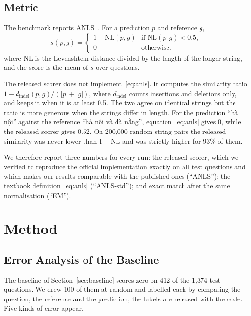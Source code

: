 \documentclass[conference]{IEEEtran}
\newcommand{\vi}[1]{{\fontencoding{T5}\selectfont #1}}
\newcommand{\vi}[1]{#1}
\begin{document}
\subsection{Metric}
\label{sec:metric}
The benchmark reports ANLS~\cite{stvqa}. For a prediction $p$ and reference $g$,
\begin{equation}
s(p, g) =
\begin{cases}
1 - \mathrm{NL}(p, g) & \text{if } \mathrm{NL}(p, g) < 0.5,\\
0 & \text{otherwise,}
\end{cases}
\label{eq:anls}
\end{equation}
where $\mathrm{NL}$ is the Levenshtein distance divided by the length of the longer string, and the score is the mean of $s$ over questions.

The released scorer does not implement~\eqref{eq:anls}. It computes the similarity ratio $1 - d_{\mathrm{indel}}(p, g) / (|p| + |g|)$, where $d_{\mathrm{indel}}$ counts insertions and deletions only, and keeps it when it is at least 0.5. The two agree on identical strings but the ratio is more generous when the strings differ in length. For the prediction ``\vi{hà nội}'' against the reference ``\vi{hà nội và đà nẵng}'', equation~\eqref{eq:anls} gives 0, while the released scorer gives 0.52. On 200{,}000 random string pairs the released similarity was never lower than $1 - \mathrm{NL}$ and was strictly higher for 93\% of them.

We therefore report three numbers for every run: the released scorer, which we verified to reproduce the official implementation exactly on all test questions and which makes our results comparable with the published ones (``ANLS''); the textbook definition~\eqref{eq:anls} (``ANLS-std''); and exact match after the same normalisation (``EM'').

\section{Method}

\subsection{Error Analysis of the Baseline}
\label{sec:errors}
The baseline of Section~\ref{sec:baseline} scores zero on 412 of the 1{,}374 test questions. We drew 100 of them at random and labelled each by comparing the question, the reference and the prediction; the labels are released with the code. Five kinds of error appear.
\end{document}

